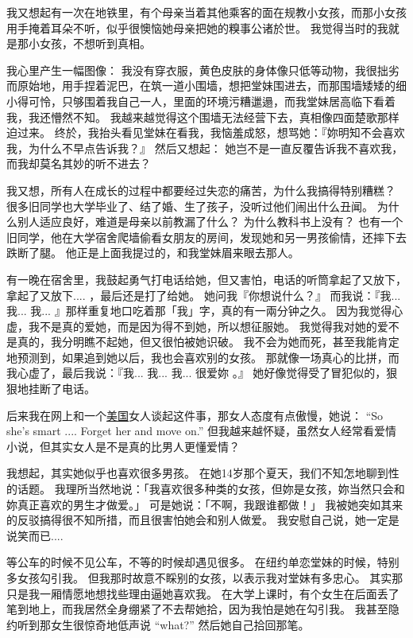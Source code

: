 \documentclass[12pt]{report}
\begin{document}
我又想起有一次在地铁里，有个母亲当着其他乘客的面在规教小女孩，而那小女孩用手掩着耳朵不听，似乎很懊恼她母亲把她的糗事公诸於世。  我觉得当时的我就是那小女孩，不想听到真相。

我心里产生一幅图像： 我没有穿衣服，黄色皮肤的身体像只低等动物，我很拙劣而原始地，用手捏着泥巴，在筑一道小围墙，想把堂妹围进去，而那围墙矮矮的细小得可怜，只够围着我自己一人，里面的环境污糟邋遢，而我堂妹居高临下看着我，我还懵然不知。  我越来越觉得这个围墙无法经营下去，真相像四面楚歌那样迫过来。  终於，我抬头看见堂妹在看我，我恼羞成怒，想骂她：『妳明知不会喜欢我，为什么不早点告诉我？』  然后又想起： 她岂不是一直反覆告诉我不喜欢我，而我却莫名其妙的听不进去？

我又想，所有人在成长的过程中都要经过失恋的痛苦，为什么我搞得特别糟糕？  很多旧同学也大学毕业了、结了婚、生了孩子，没听过他们闹出什么丑闻。  为什么别人适应良好，难道是母亲以前教漏了什么？   为什么教科书上没有？   也有一个旧同学，他在大学宿舍爬墙偷看女朋友的房间，发现她和另一男孩偷情，还摔下去跌断了腿。   他正是上面我提过的，和我堂妹眉来眼去那人。

有一晚在宿舍里，我鼓起勇气打电话给她，但又害怕，电话的听筒拿起了又放下，拿起了又放下.... ，最后还是打了给她。 她问我『你想说什么？』   而我说：『我... 我... 我... 』那样重复地口吃着那「我」字，真的有一兩分钟之久。  因为我觉得心虚，我不是真的爱她，而是因为得不到她，所以想征服她。  我觉得我对她的爱不是真的，我分明瞧不起她，但又很怕被她识破。  我不会为她而死，甚至我能肯定地预测到，如果追到她以后，我也会喜欢别的女孩。  那就像一场真心的比拼，而我心虚了，最后我说：『我... 我... 我... 很爱妳 。』  她好像觉得受了冒犯似的，狠狠地挂断了电话。

后来我在网上和一个\underline{美国}女人谈起这件事，那女人态度有点傲慢，她说： ``So she's smart .... Forget her and move on.''  但我越来越怀疑，虽然女人经常看爱情小说，但其实女人是不是真的比男人更懂爱情？

我想起，其实她似乎也喜欢很多男孩。 在她14岁那个夏天，我们不知怎地聊到性的话题。  我理所当然地说：「我喜欢很多种类的女孩，但妳是女孩，妳当然只会和妳真正喜欢的男生才做爱。」 可是她说：「不啊，我跟谁都做！」 我被她突如其来的反驳搞得很不知所措，而且很害怕她会和别人做爱。 我安慰自己说，她一定是说笑而已....

等公车的时候不见公车，不等的时候却遇见很多。  在纽约单恋堂妹的时候，特别多女孩勾引我。 但我那时故意不睬别的女孩，以表示我对堂妹有多忠心。  其实那只是我一厢情愿地想找些理由逼她喜欢我。  在大学上课时，有个女生在后面丢了笔到地上，而我居然全身绷紧了不去帮她拾，因为我怕是她在勾引我。  我甚至隐约听到那女生很惊奇地低声说 ``what?'' 然后她自己拾回那笔。
\end{document}
